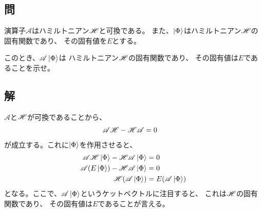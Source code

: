 \subsection{問}
演算子$\mathscr{A}$はハミルトニアン${\mathscr{H}}$と可換である。
また、$\ket{\Phi}$はハミルトニアン${\mathscr{H}}$の固有関数であり、
その固有値を$E$とする。

このとき、$\mathscr{A}\ket{\Phi}$は
ハミルトニアン${\mathscr{H}}$の固有関数であり、
その固有値は$E$であることを示せ。

\subsection{解}
$\mathscr{A}$と${\mathscr{H}}$が可換であることから、
\begin{align}
	\mathscr{A}{\mathscr{H}}
	-
	{\mathscr{H}}\mathscr{A}
&=
	0
\end{align}
が成立する。これに$\ket{\Phi}$を作用させると、
\begin{align}
	\mathscr{A}\H \ket{\Phi}
	-
	\H\mathscr{A} \ket{\Phi}
&=
	0 \\
%
%
	\mathscr{A}(E \ket{\Phi})
	-
	\H\mathscr{A} \ket{\Phi}
&=
	0 \\
%
%
	\H(\mathscr{A} \ket{\Phi})
&=
	E (\mathscr{A} \ket{\Phi})
\end{align}
となる。ここで、$\mathscr{A}\ket{\Phi}$というケットベクトルに注目すると、
これは${\mathscr{H}}$の固有関数であり、
その固有値は$E$であることが言える。

